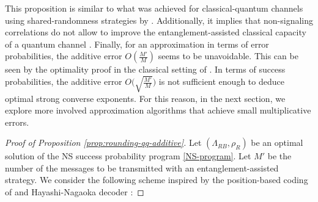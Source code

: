 \documentclass[a4paper,onecolumn,11pt,accepted=2025-10-01]{quantumarticle}
\DeclareMathOperator{\suc}{Succ}
\newcommand*{\cN}{\mathcal{N}}
\newcommand*{\cS}{\mathcal{S}}
\newcommand*{\tr}[1]{\mathrm{Tr}\left[#1\right]}
\newcommand*{\mle}{\preccurlyeq}
\begin{document}
This proposition is similar to what was achieved for classical-quantum channels using shared-randomness strategies by \cite{Fawzi19}. Additionally, it implies that  non-signaling correlations do not allow to improve the entanglement-assisted classical capacity of a quantum channel \cite{Leung2015Jun}. Finally, for an approximation in terms of error probabilities, the additive error $O(\frac{M'}{M})$ seems to be unavoidable. This can be seen by the optimality proof  in the classical setting of \cite{barman2017algorithmic}. In terms of success probabilities, the additive error $O\big(\sqrt{\frac{M'}{M}}\big)$ is not sufficient enough to deduce optimal strong converse exponents. For this reason, in the next section,  we explore more involved approximation algorithms that achieve small multiplicative errors. 

\begin{proof}[Proof of Proposition \ref{prop:rounding-qq-additive}]
Let $(\Lambda_{RB}, \rho_{R})$ be an optimal solution of the NS  success probability program \eqref{NS-program}.  Let $M'$ be the number of the messages  to be transmitted with an entanglement-assisted strategy. 
We consider the following scheme inspired by the position-based coding of \cite{Anshu2018Jun} and Hayashi-Nagaoka decoder \cite{Hayashi2003Jun}:


\end{proof}
\end{document}
